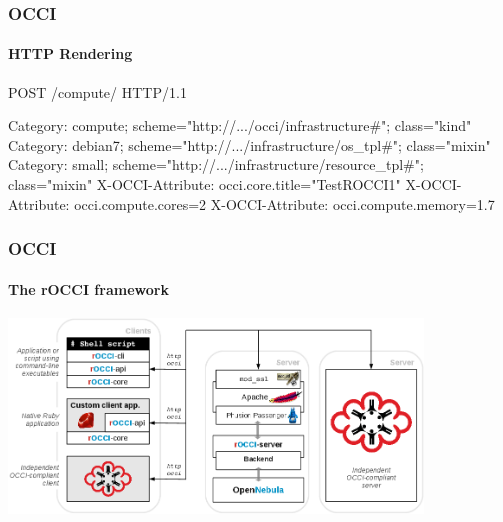 \begin{frame}[fragile]
  \frametitle{OCCI}
  \framesubtitle{HTTP Rendering}

\begin{terminalbox}{}
POST /compute/ HTTP/1.1

Category: compute;
          scheme="http://.../occi/infrastructure#";
          class="kind"
Category: debian7;
          scheme="http://.../infrastructure/os_tpl#";
          class="mixin"
Category: small;
          scheme="http://.../infrastructure/resource_tpl#";
          class="mixin"
X-OCCI-Attribute: occi.core.title="TestROCCI1"
X-OCCI-Attribute: occi.compute.cores=2
X-OCCI-Attribute: occi.compute.memory=1.7
\end{terminalbox}
\end{frame}

\begin{frame}
  \frametitle{OCCI}
  \framesubtitle{The rOCCI framework}

  \includegraphics[width=11cm]{images/OCCI_client_servers}
\end{frame}

